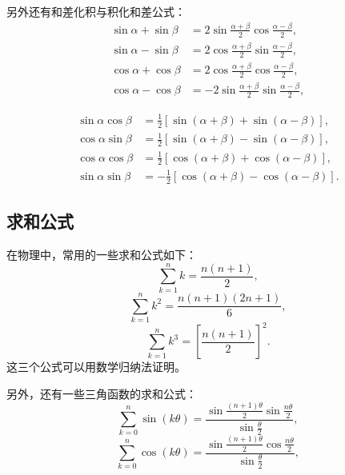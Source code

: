另外还有和差化积与积化和差公式：
\begin{equation}
    \begin{aligned}
        \sin \alpha + \sin \beta & = 2 \sin \frac{\alpha + \beta}{2} \cos \frac{\alpha - \beta}{2} ,  \\
        \sin \alpha - \sin \beta & = 2 \cos \frac{\alpha + \beta}{2} \sin \frac{\alpha - \beta}{2} ,  \\
        \cos \alpha + \cos \beta & = 2 \cos \frac{\alpha + \beta}{2} \cos \frac{\alpha - \beta}{2} ,  \\
        \cos \alpha - \cos \beta & = -2 \sin \frac{\alpha + \beta}{2} \sin \frac{\alpha - \beta}{2} ,
    \end{aligned}
\end{equation}

\begin{equation}
    \begin{aligned}
        \sin \alpha \cos \beta & = \frac{1}{2} [\sin (\alpha + \beta) + \sin (\alpha - \beta)] ,  \\
        \cos \alpha \sin \beta & = \frac{1}{2} [\sin (\alpha + \beta) - \sin (\alpha - \beta)] ,  \\
        \cos \alpha \cos \beta & = \frac{1}{2} [\cos (\alpha + \beta) + \cos (\alpha - \beta)] ,  \\
        \sin \alpha \sin \beta & = -\frac{1}{2} [\cos (\alpha + \beta) - \cos (\alpha - \beta)] .
    \end{aligned}
\end{equation}

\subsection{求和公式}\label{subsec:summation-formulas}

在物理中，常用的一些求和公式如下：
\begin{equation}
    \sum_{k=1}^{n} k = \frac{n (n+1)}{2} ,
\end{equation}
\begin{equation}
    \sum_{k=1}^{n} k^2 = \frac{n (n+1) (2n+1)}{6} ,
\end{equation}
\begin{equation}
    \sum_{k=1}^{n} k^3 = \left[ \frac{n (n+1)}{2} \right]^2 .
\end{equation}
这三个公式可以用数学归纳法证明。

另外，还有一些三角函数的求和公式：
\begin{equation}
    \sum_{k=0}^{n} \sin (k \theta) = \frac{\sin \frac{(n+1) \theta}{2} \sin \frac{n \theta}{2}}{\sin \frac{\theta}{2}} ,
\end{equation}
\begin{equation}
    \sum_{k=0}^{n} \cos (k \theta) = \frac{\sin \frac{(n+1) \theta}{2} \cos \frac{n \theta}{2}}{\sin \frac{\theta}{2}} ,
\end{equation}


